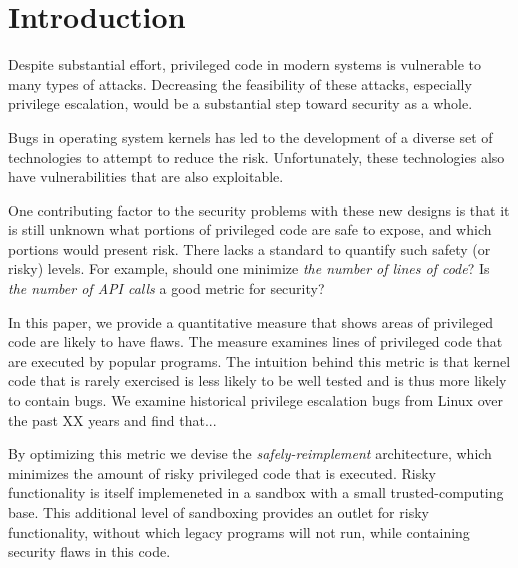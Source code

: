 \section{Introduction}
\label{sec.introduction}
Despite substantial effort, privileged code in modern systems is vulnerable 
to many types of attacks.  
Decreasing the feasibility of these attacks, especially privilege escalation, 
would be a substantial step toward security as a whole.

Bugs in operating system kernels has led to the development of a diverse set of
technologies to attempt to reduce the risk.    Unfortunately, these technologies also 
have vulnerabilities that are also exploitable.

One contributing factor to the security problems with these new designs is
that it is still unknown what portions of privileged code are
safe to expose, and which portions would present risk. There lacks a standard 
to quantify such safety (or risky) levels. For example, should one minimize 
\textit{the number of lines of code}?   Is \textit{the number of API 
calls} a good metric for security?    

In this paper, we provide a quantitative measure that shows
areas of privileged code are likely to have flaws.  
The measure examines lines of privileged code that are executed by popular 
programs.  The intuition behind this metric is that kernel code that is rarely
exercised is less likely to be well tested and is thus more likely to contain
bugs.  We examine historical privilege escalation bugs from Linux over
the past XX years and find that...

By optimizing this metric   we devise the \emph{safely-reimplement}
architecture, which minimizes the amount of risky privileged code that is
executed.  
Risky functionality is itself implemeneted in a sandbox with
a small trusted-computing base.  
This additional level of sandboxing 
provides an outlet for risky functionality, without which legacy programs
will not run, while containing security flaws in this code.  

